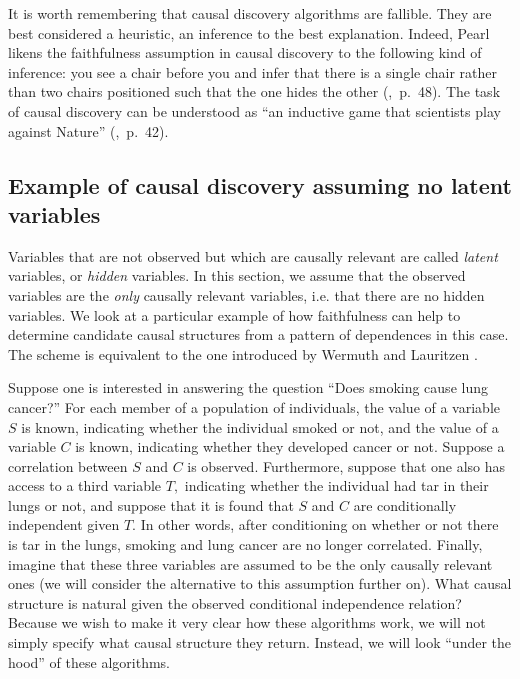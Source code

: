 \documentclass[letterpaper,onecolumn,nofootinbib]{revtex4}
\begin{document}
It is worth remembering that causal discovery algorithms are fallible.
They are best considered a heuristic, an inference to the best explanation.
Indeed, Pearl likens the faithfulness assumption in causal discovery to the
following kind of inference: you see a chair before you and infer that there
is a single chair rather than two chairs positioned such that the one hides
the other (\cite{Pearl2009},~p.~48).  The task of causal discovery can be understood
as ``an inductive game that scientists play against Nature'' (\cite{Pearl2009},~p.~42).

\subsection{Example of causal discovery assuming no latent variables}
\label{sec:causal-nohvar}

Variables that are not observed but which are causally relevant are called \emph{latent} variables, or \emph{hidden} variables. In this section, we assume
that the observed variables are the \emph{only} causally relevant
variables, i.e. that there are no hidden
variables.  We look at a particular example of how faithfulness can help to determine
candidate causal structures from a pattern of dependences in this case.  The scheme is equivalent to the one introduced by Wermuth and Lauritzen \cite{Wermuth1983}.

Suppose one is interested in answering the question ``Does smoking cause lung cancer?''
 For each member of a population of individuals, the value of a
variable $S$ is known, indicating whether the individual smoked or not, and the value
of a variable $C$ is known, indicating whether they developed cancer or not.
Suppose a correlation between $S$ and $C$ is observed. Furthermore, suppose
that one also has access to a third variable $T,$ indicating whether the individual
had tar in their lungs or not, and suppose that it is found that $S$ and $C$ are conditionally
independent given $T.$ In other words, after conditioning on whether or
not there is tar in the lungs, smoking and lung cancer are no longer
correlated. Finally, imagine that these three variables are assumed to be
the only causally relevant ones (we will consider the alternative to this
assumption further on). What causal structure is natural given the observed
conditional independence relation?
Because we wish to make it very clear how these algorithms work, we will not
simply specify what causal structure they return. Instead, we will look
``under the hood'' of these algorithms.
\end{document}
